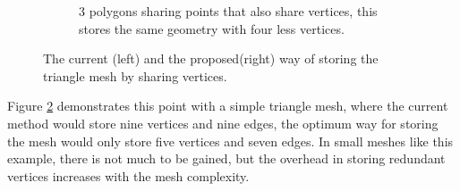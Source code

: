\begin{figure}
\begin{subfigure}[b]{0.48\textwidth}
                \caption{3 polygons sharing points that also share vertices,
                this stores the same geometry with four less vertices.}
                \label{fig:vertex-overlay1}
        \end{subfigure}
        \caption{The current (left) and the proposed(right) way of storing the
        triangle mesh by sharing vertices.}
        \label{fig:vertex-overlay}
\end{figure}

Figure \ref{fig:vertex-overlay} demonstrates this point with a simple triangle
mesh, where the current method would store nine vertices and nine edges, the optimum
way for storing the mesh would only store five vertices and seven edges. In small
meshes like this example, there is not much to be gained, but the overhead in
storing redundant vertices increases with the mesh complexity.